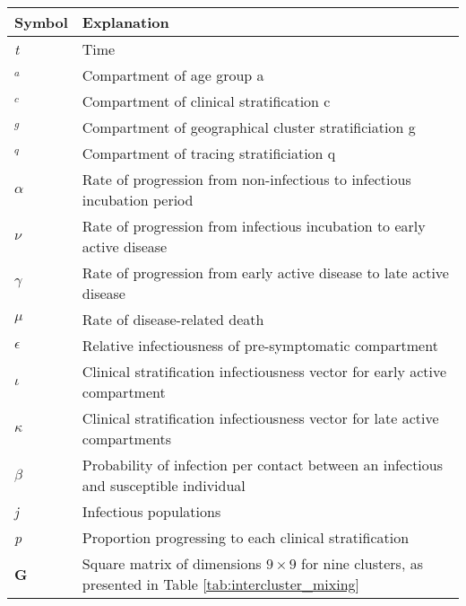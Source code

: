 \begin{table}[ht]
\renewcommand{\baselinestretch}{1}
    	\begin{tabular}{| p{2cm} | p{11.1cm} |}
    	\hline
    		Symbol & Explanation \\
    		\hline
    		\textit{t} & Time  \\
    		$_{\textit{a}}$ & Compartment of age group a \\
    		$_{\textit{c}}$ & Compartment of clinical stratification c \\
    		$_{\textit{g}}$ & Compartment of geographical cluster stratificiation g \\
    		$_{\textit{q}}$ & Compartment of tracing stratificiation q \\
    		$\alpha$ & Rate of progression from non-infectious to infectious incubation period \\
    		$\nu$ & Rate of progression from infectious incubation to early active disease \\
    		$\gamma$ & Rate of progression from early active disease to late active disease \\
    		$\mu$ & Rate of disease-related death \\
    		$\epsilon$ & Relative infectiousness of pre-symptomatic compartment \\
    		$\iota$ & Clinical stratification infectiousness vector for early active compartment \\
    		$\kappa$ & Clinical stratification infectiousness vector for late active compartments \\
    		$\beta$ & Probability of infection per contact between an infectious and susceptible individual \\
	    	\textit{j} & Infectious populations \\
    		\textit{p} & Proportion progressing to each clinical stratification \\
    		\textbf{G} & Square matrix of dimensions \(9 \times 9\) for nine clusters, as presented in Table \ref{tab:intercluster_mixing} \\
    \hline
	\end{tabular}
\end{table}

